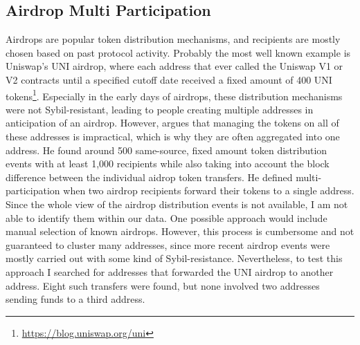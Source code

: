 \documentclass[12pt,a4paper,titlepage,oneside,english]{article}
\begin{document}
\subsection{Airdrop Multi Participation}
Airdrops are popular token distribution mechanisms, and recipients are mostly chosen based on past protocol activity. Probably the most well known example is Uniswap's UNI airdrop, where each address that ever called the Uniswap V1 or V2 contracts until a specified cutoff date received a fixed amount of 400 UNI tokens\footnote{\url{https://blog.uniswap.org/uni}}. Especially in the early days of airdrops, these distribution mechanisms were not Sybil-resistant, leading to people creating multiple addresses in anticipation of an airdrop. However, \cite{FV:17} argues that managing the tokens on all of these addresses is impractical, which is why they are often aggregated into one address. He found around 500 same-source, fixed amount token distribution events with at least 1,000 recipients while also taking into account the block difference between the individual aidrop token transfers. He defined multi-participation when two airdrop recipients forward their tokens to a single address. Since the whole view of the airdrop distribution events is not available, I am not able to identify them within our data. One possible approach would include manual selection of known airdrops. However, this process is cumbersome and not guaranteed to cluster many addresses, since more recent airdrop events were mostly carried out with some kind of Sybil-resistance. Nevertheless, to test this approach I searched for addresses that forwarded the UNI airdrop to another address. Eight such transfers were found, but none involved two addresses sending funds to a third address.
\end{document}
